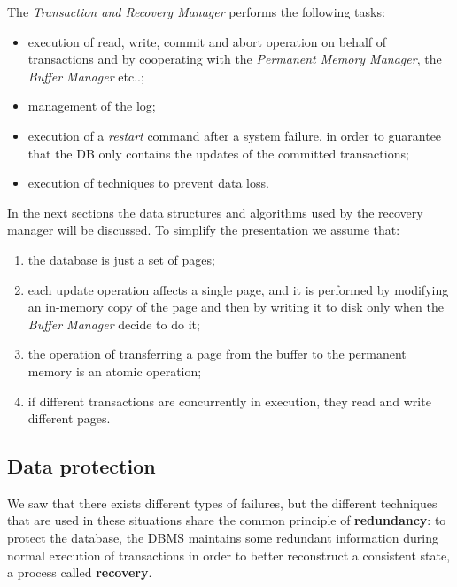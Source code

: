The \textit{Transaction and Recovery Manager} performs the following tasks:

\begin{itemize}

    \item execution of read, write, commit and abort operation on behalf of transactions and by cooperating with the \textit{Permanent Memory Manager}, the \textit{Buffer Manager} etc..;

    \item management of the log;

    \item execution of a \textit{restart} command after a system failure, in order to guarantee that the DB only contains the updates of the committed transactions;

    \item execution of techniques to prevent data loss.
    
\end{itemize}

In the next sections the data structures and algorithms used by the recovery manager will be discussed. To simplify the presentation we assume that:

\begin{enumerate}

    \item the database is just a set of pages;
    
    \item each update operation affects a single page, and it is performed by modifying an in-memory copy of the page and then by writing it to disk only when the \textit{Buffer Manager} decide to do it;
    
    \item the operation of transferring a page from the buffer to the permanent memory is an atomic operation;
    
    \item if different transactions are concurrently in execution, they read and write different pages. 
    
\end{enumerate}

\subsection{Data protection}
We saw that there exists different types of failures, but the different techniques that are used in these situations share the common principle of \textbf{redundancy}: to protect the database, the DBMS maintains some redundant information during normal execution of transactions in order to better reconstruct a consistent state, a process called \textbf{recovery}.

